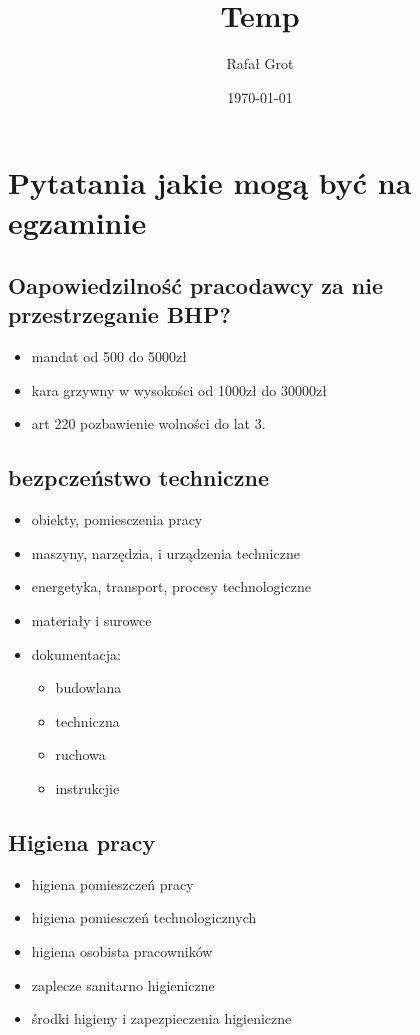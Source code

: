 \documentclass[11pt]{article}
\author{Rafał Grot}
\date{\today}
\title{Temp}
\begin{document}
\maketitle
\tableofcontents

\section{Pytatania jakie mogą być na egzaminie}
\label{sec:org3701d1f}
\subsection{Oapowiedzilność pracodawcy za nie przestrzeganie BHP?}
\label{sec:org0f8879f}
\begin{itemize}
\item mandat od 500 do 5000zł
\item kara grzywny w wysokości od 1000zł do 30000zł
\item art 220 pozbawienie wolności do lat 3.
\end{itemize}
\subsection{bezpczeństwo techniczne}
\label{sec:orge072817}
\begin{itemize}
\item obiekty, pomiesczenia pracy
\item maszyny, narzędzia, i urządzenia techniczne
\item energetyka, transport, procesy technologiczne
\item materiały i surowce
\item dokumentacja:
\begin{itemize}
\item budowlana
\item techniczna
\item ruchowa
\item instrukcjie
\end{itemize}
\end{itemize}
\subsection{Higiena pracy}
\label{sec:orgf50f244}
\begin{itemize}
\item higiena pomieszczeń pracy
\item higiena pomiesczeń technologicznych
\item higiena osobista pracowników
\item zaplecze sanitarno higieniczne
\item środki higieny i zapezpieczenia higieniczne
\end{itemize}
\end{document}
